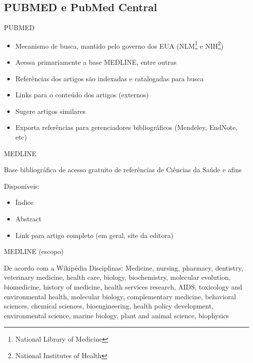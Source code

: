 \documentclass{beamer}
\begin{document}
\subsection{PUBMED e PubMed Central}

\begin{frame}{PUBMED}
  \begin{itemize}
  \item \alert{Mecanismo de busca}, mantido pelo governo dos EUA
    (NLM\footnote{National Library of Medicine} e
    NIH\footnote{National Institutes of Health})
  \item Acessa primariamente a base MEDLINE, entre outras
  \item Referências dos artigos são indexadas e catalogadas para busca
  \item Links para o conteúdo dos artigos (externos)
  \item Sugere artigos similares
  \item Exporta referências para gerenciadores bibliográficos
    (Mendeley, EndNote, etc)
  \end{itemize}
\end{frame}

\begin{frame}{MEDLINE}
  \begin{definition}
    Base bibliográfica de acesso gratuito de referências de Ciências
    da Saúde e afins
  \end{definition}
  Disponíveis:
  \begin{itemize}
  \item Índice
  \item Abstract
  \item Link para artigo completo (em geral, site da editora)
  \end{itemize}
\end{frame}

\begin{frame}{MEDLINE (escopo)}
  \begin{block}{De acordo com a Wikipédia}
    Disciplinas: Medicine, nursing, pharmacy, dentistry, veterinary
    medicine, health care, biology, biochemistry, molecular evolution,
    biomedicine, history of medicine, health services research, AIDS,
    toxicology and environmental health, molecular biology,
    complementary medicine, behavioral sciences, chemical sciences,
    bioengineering, health policy development, environmental science,
    marine biology, plant and animal science, biophysics
  \end{block}
\end{frame}
\end{document}
